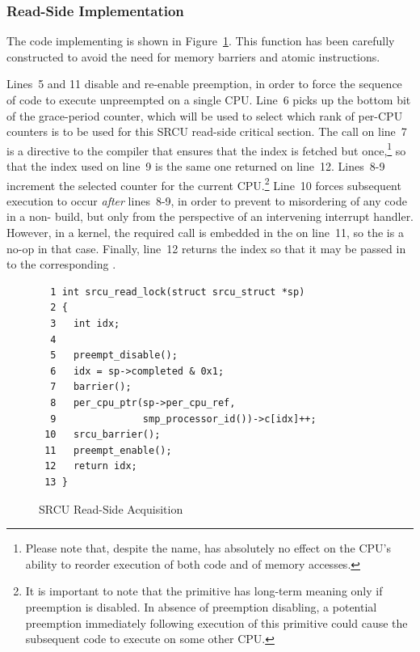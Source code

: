 \subsubsection{Read-Side Implementation}
\label{sec:app:rcuimpl:Read-Side Implementation}

The code implementing  is shown in
Figure~\ref{fig:app:rcuimpl:Read-Side Acquisition}.
This function has been carefully constructed to avoid the
need for memory barriers and atomic instructions.

Lines~5 and 11 disable and re-enable preemption, in order to force
the sequence of code to execute unpreempted on a single CPU.
Line~6 picks up the bottom bit of the grace-period counter, which will
be used to select which rank of per-CPU counters is to be used for this
SRCU read-side critical section.
The  call on line~7 is a directive to the compiler
that ensures that the index is
fetched but once,\footnote{
	Please note that, despite the name, 
	has absolutely no effect on the CPU's ability to
	reorder execution of both code and of memory accesses.}
so that the index used on line~9 is the same
one returned on line~12.
Lines~8-9 increment the selected counter for the current CPU.\footnote{
	It is important to note that the  primitive
	has long-term meaning only if preemption is disabled.
	In absence of preemption disabling, a potential preemption
	immediately following execution of this primitive could
	cause the subsequent code to execute on some other CPU.}
Line~10 forces subsequent execution to occur \emph{after}
lines~8-9, in order to prevent to misordering of any code
in a non- build, but only
from the perspective of an intervening interrupt handler.
However, in a  kernel, the required 
call is embedded in the  on line~11, so the
 is a no-op in that case.
Finally, line~12 returns the index so that it may be passed in to the
corresponding .

\begin{figure}[htbp]
{ \scriptsize
\begin{verbatim}
  1 int srcu_read_lock(struct srcu_struct *sp)
  2 {
  3   int idx;
  4
  5   preempt_disable();
  6   idx = sp->completed & 0x1;
  7   barrier();
  8   per_cpu_ptr(sp->per_cpu_ref,
  9               smp_processor_id())->c[idx]++;
 10   srcu_barrier();
 11   preempt_enable();
 12   return idx;
 13 }
\end{verbatim}
}
\caption{SRCU Read-Side Acquisition}
\label{fig:app:rcuimpl:Read-Side Acquisition}
\end{figure}

